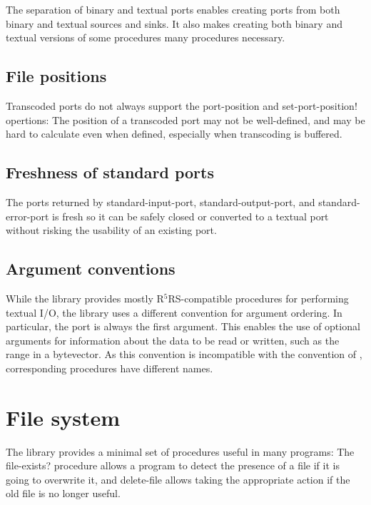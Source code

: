 \documentclass[twoside,twocolumn]{algol60}
\newcommand{\rn}[1]{R$^{#1}$RS}
\begin{document}
The separation of binary and textual ports enables creating ports from
both binary and textual sources and sinks.  It also makes creating
both binary and textual versions of some procedures many procedures
necessary.

\section{File positions}

Transcoded ports do not always support the {\cf port-position} and
{\cf set-port-position!} opertions: The position of a transcoded port
may not be well-defined, and may be hard to calculate even when
defined, especially when transcoding is buffered.

\section{Freshness of standard ports}

The ports returned by {\cf standard-input-port}, {\cf
  standard-output-port}, and {\cf standard-error-port} is fresh so it
can be safely closed or converted to a textual port without risking
the usability of an existing port.


\section{Argument conventions}

While the  library provides mostly
\rn{5}-compatible procedures for performing textual I/O, the
 library uses a different convention for
argument ordering.  In particular, the port is always the first
argument.  This enables the use of optional arguments for information
about the data to be read or written, such as the range in a
bytevector.  As this convention is incompatible with the convention of
, corresponding procedures have different
names.

\chapter{File system}

The  library provides a minimal set of procedures
useful in many programs: The {\cf file-exists?} procedure allows a
program to detect the presence of a file if it is going to overwrite
it, and {\cf delete-file} allows taking the appropriate action if the
old file is no longer useful.
\end{document}
